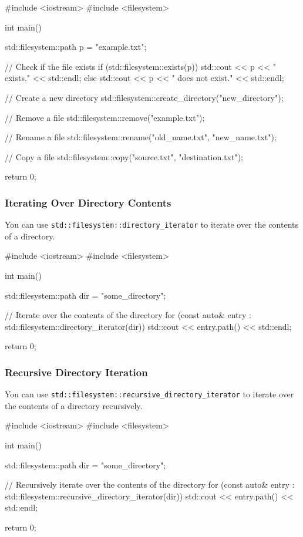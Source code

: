\begin{exampleblock}
\begin{codeblock}[language=C++]
#include <iostream>
#include <filesystem>

int main() {
    std::filesystem::path p = "example.txt";

    // Check if the file exists
    if (std::filesystem::exists(p)) {
        std::cout << p << " exists." << std::endl;
    } else {
        std::cout << p << " does not exist." << std::endl;
    }

    // Create a new directory
    std::filesystem::create_directory("new_directory");

    // Remove a file
    std::filesystem::remove("example.txt");

    // Rename a file
    std::filesystem::rename("old_name.txt", "new_name.txt");

    // Copy a file
    std::filesystem::copy("source.txt", "destination.txt");

    return 0;
}
\end{codeblock}
\end{exampleblock}

\subsubsection*{Iterating Over Directory Contents}
You can use \texttt{std::filesystem::directory\_iterator} to iterate over the contents of a directory.

\begin{exampleblock}
\begin{codeblock}[language=C++]
#include <iostream>
#include <filesystem>

int main() {
    std::filesystem::path dir = "some_directory";

    // Iterate over the contents of the directory
    for (const auto& entry : std::filesystem::directory_iterator(dir)) {
        std::cout << entry.path() << std::endl;
    }

    return 0;
}
\end{codeblock}
\end{exampleblock}

\subsubsection*{Recursive Directory Iteration}
You can use \texttt{std::filesystem::recursive\_directory\_iterator} to iterate over the contents of a directory recursively.

\begin{exampleblock}
\begin{codeblock}[language=C++]
#include <iostream>
#include <filesystem>

int main() {
    std::filesystem::path dir = "some_directory";

    // Recursively iterate over the contents of the directory
    for (const auto& entry : std::filesystem::recursive_directory_iterator(dir)) {
        std::cout << entry.path() << std::endl;
    }

    return 0;
}
\end{codeblock}
\end{exampleblock}


